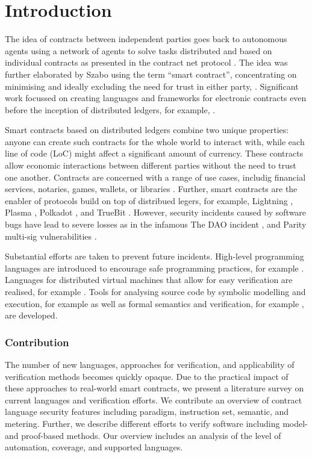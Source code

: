 \section{Introduction}
The idea of contracts between independent parties goes back to autonomous agents using a network of agents to solve tasks distributed and based on individual contracts as presented in the contract net protocol  \cite{Smith1980}.
The idea was further elaborated by Szabo using the term ``smart contract'', concentrating on minimising and ideally excluding the need for trust in either party,  \cite{Szabo1997}.
Significant work focussed on creating languages and frameworks for electronic contracts even before the inception of distributed ledgers, for example, \cite{Andersen2006,Kyas2008,Xu2004}.


Smart contracts based on distributed ledgers combine two unique properties: anyone can create such contracts for the whole world to interact with, while each line of code (LoC) might affect a significant amount of currency.
These contracts allow economic interactions between different parties without the need to trust one another.
Contracts are concerned with a range of use cases, includig financial services, notaries, games, wallets, or libraries \cite{Bartoletti2017}.
Further, smart contracts are the enabler of protocols build on top of distribued legers, for example, Lightning \cite{Poon2016}, Plasma \cite{Poon2017}, Polkadot \cite{Wood2017}, and TrueBit \cite{Teutsch2017}.
However, security incidents caused by software bugs have lead to severe losses as in the infamous The DAO incident \cite{Daian2016}, and Parity multi-sig vulnerabilities \cite{Breidenbach2017Parity,ParityTech2017}. 


Substantial efforts are taken to prevent future incidents. 
High-level programming languages are introduced to encourage safe programming practices, for example  \cite{Hirai2018Bamboo,Ethereum2018Vyper,Schrans2018}.
Languages for distributed virtual machines that allow for easy verification are realised, for example \cite{Sergey2018,DynamicLedgerSolutions2017,Popejoy2017,Kasampalis2018}.
Tools for analysing source code by symbolic modelling and execution, for example \cite{Luu2016,Tsankov2017,Kalra2018,Albert2018} as well as formal semantics and verification, for example \cite{Bhargavan2016,Hildenbrandt2017,Hirai2017}, are developed.

\subsubsection{Contribution} The number of new languages, approaches for verification, and applicability of verification methods becomes quickly opaque. Due to the practical impact of these approaches to real-world smart contracts, we present a literature survey on current languages and verification efforts.
We contribute an overview of contract language security features including paradigm, instruction set, semantic, and metering.
Further, we describe different efforts to verify software including model- and proof-based methods. Our overview includes an analysis of the level of automation, coverage, and supported languages.

